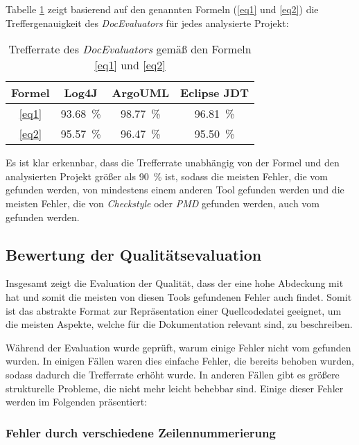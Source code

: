 Tabelle \ref{tab:hit_rate} zeigt basierend auf den genannten Formeln (\ref{eq1} und \ref{eq2}) die Treffergenauigkeit des \textit{DocEvaluators} für jedes analysierte Projekt:
\begin{table}[]
    \centering
    \begin{tabular}{c|c|c|c}
    Formel & Log4J & ArgoUML & Eclipse \ac{JDT} \\ \hline
    \ref{eq1} &   93.68~\% &	98.77~\% &	96.81~\% \\\hline
     \ref{eq2} & 95.57~\% &	96.47~\% &	95.50~\% \\\hline

    \end{tabular}
    \caption{Trefferrate des \textit{DocEvaluators} gemäß den Formeln \ref{eq1} und \ref{eq2}}
    \label{tab:hit_rate}
\end{table}
Es ist klar erkennbar, dass die Trefferrate unabhängig von der Formel und den analysierten Projekt größer als 90~\% ist, sodass die meisten Fehler, die vom \doceval gefunden werden, von mindestens einem anderen Tool gefunden werden und die meisten Fehler, die von \textit{Checkstyle} oder \textit{PMD} gefunden werden, auch vom \doceval gefunden werden.






\subsection{Bewertung der Qualitätsevaluation}
Insgesamt zeigt die Evaluation der Qualität, dass der \doceval eine hohe Abdeckung mit \checkpmd hat und somit die meisten von diesen Tools gefundenen Fehler auch findet. Somit ist das abstrakte Format zur Repräsentation einer Quellcodedatei geeignet, um die meisten Aspekte, welche für die Dokumentation relevant sind, zu beschreiben. 

Während der Evaluation wurde geprüft, warum einige Fehler nicht vom \doceval gefunden wurden. In einigen Fällen waren dies einfache Fehler, die bereits behoben wurden, sodass dadurch die Trefferrate erhöht wurde. In anderen Fällen gibt es größere strukturelle Probleme, die nicht mehr leicht behebbar sind. Einige dieser Fehler werden im Folgenden präsentiert: 
\subsubsection{Fehler durch verschiedene Zeilennummerierung}


